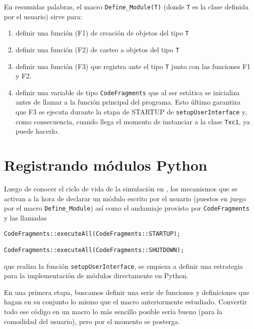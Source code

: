 En resumidas palabras, el macro \verb!Define_Module(T)!  (donde \verb!T! es la
clase definida por el usuario) sirve para:

\begin{enumerate}
    \item definir una función (F1) de creación de objetos del tipo \verb!T!

    \item definir una función (F2) de casteo a objetos del tipo \verb!T!

    \item definir una función (F3) que registra ante \omnetpp{} el tipo
\verb!T! junto con las funciones F1 y F2.

    \item definir una variable de tipo \verb!CodeFragments! que al ser estática
se inicializa antes de llamar a la función principal del programa. Esto último
garantiza que F3 se ejecuta durante la etapa de STARTUP de
\verb!setupUserInterface! y, como consecuencia, cuando llega el momento de
instanciar a la clase \verb!Txc1!, \omnetpp{} ya puede hacerlo.

\end{enumerate}

\section{Registrando módulos Python}

Luego de conocer el ciclo de vida de la simulación en \omnetpp{}, los mecanismos
que se activan a la hora de declarar un módulo escrito por el usuario (puestos
en juego por el macro \verb!Define_Module!) así como el andamiaje provisto por
\verb!CodeFragments! y las llamadas

\begin{verbatim}
CodeFragments::executeAll(CodeFragments::STARTUP);

CodeFragments::executeAll(CodeFragments::SHUTDOWN);
\end{verbatim}

\noindent que realiza la función \verb!setupUserInterface!, se empieza a definir una
estrategia para la implementación de módulos directamente en Python.

En una primera etapa, buscamos definir una serie de funciones y definiciones
que hagan en su conjunto lo mismo que el macro anteriormente estudiado.
Convertir todo ese código en un macro lo más sencillo posible sería bueno (para
la comodidad del usuario), pero por el momento se posterga.

